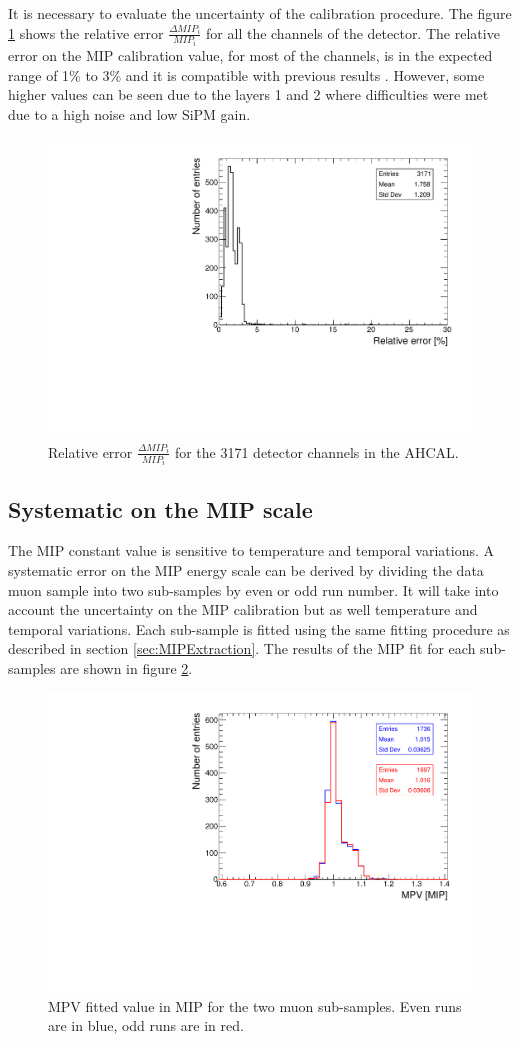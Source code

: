It is necessary to evaluate the uncertainty of the calibration procedure. The figure \ref{fig:MIPError} shows the relative error $\frac{\Delta MIP_i}{MIP_i}$ for all the channels of the detector. The relative error on the MIP calibration value, for most of the channels, is in the expected range of 1\% to 3\% and it is compatible with previous results \cite{SarahMaster}. However, some higher values can be seen due to the layers 1 and 2 where difficulties were met due to a high noise and low SiPM gain.

\begin{figure}[htbp!]
	\centering
	\includegraphics[width=0.6\linewidth]{../Thesis_Plots/EnergyCalib/Plots/RelativeErrorMIP_Combined.pdf}
	\caption{Relative error $\frac{\Delta MIP_i}{MIP_i}$ for the 3171 detector channels in the AHCAL.} \label{fig:MIPError}
\end{figure}

\subsection{Systematic on the MIP scale}

The MIP constant value is sensitive to temperature and temporal variations. A systematic error on the MIP energy scale can be derived by dividing the data muon sample into two sub-samples by even or odd run number. It will take into account the uncertainty on the MIP calibration but as well temperature and temporal variations. Each sub-sample is fitted using the same fitting procedure as described in section \ref{sec:MIPExtraction}. The results of the MIP fit for each sub-samples are shown in figure \ref{fig:MIPSyst}.

\begin{figure}[htbp!]
	\centering
	\includegraphics[width=0.6\linewidth]{../Thesis_Plots/EnergyCalib/Plots/SystematicMIP.pdf}
	\caption{MPV fitted value in MIP for the two muon sub-samples. Even runs are in blue, odd runs are in red.} \label{fig:MIPSyst}
\end{figure}

